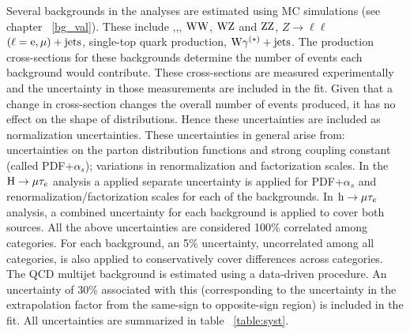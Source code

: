 Several backgrounds in the analyses are estimated using MC simulations (see chapter ~\ref{bg_val}). These include \ztt,\ttb,\wjets, $\text{W}\text{W}$, $\text{W}\text{Z}$ and $\text{Z}\text{Z}$, $Z\to\ell\ell$ $(\ell = \text{e}, \mu)+\text{jets}$, single-top quark production, $\text{W}\gamma^{(*)}+\text{jets}$. The production cross-sections for these backgrounds determine the number of events each background would contribute. These cross-sections are measured experimentally and the uncertainty in those measurements are included in the fit. Given that a change in cross-section changes the overall number of events produced, it has no effect on the shape of distributions. Hence these uncertainties are included as normalization uncertainties. These uncertainties in general  arise from: uncertainties on the parton distribution functions and strong coupling constant (called PDF+$\alpha_s$); variations in renormalization and factorization scales. In the $\text{H} \to \mu \tau_{e}$ analysis a applied separate uncertainty is applied for PDF+$\alpha_s$ and renormalization/factorization scales for each of the backgrounds. In $\text{h} \to \mu \tau_{e}$ analysis, a combined uncertainty for each background is applied to cover both sources. All the above uncertainties are considered 100\% correlated among categories. For each background, an 5\% uncertainty, uncorrelated among all categories, is also applied to conservatively cover differences across categories. The QCD multijet background is estimated using a data-driven procedure. An uncertainty of 30\% associated with this (corresponding to the uncertainty in the extrapolation factor from the same-sign to opposite-sign region) is included in the fit. All uncertainties are summarized in table ~\ref{table:syst}.

